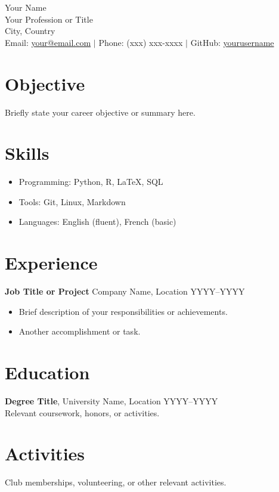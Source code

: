 \documentclass[a4paper,10pt]{article}
\begin{document}
\begin{center}
    {\LARGE Your Name} \\
    Your Profession or Title \\
    City, Country \\
    Email: \href{mailto:your@email.com}{your@email.com} $\vert$ Phone: (xxx) xxx-xxxx $\vert$ GitHub: \href{https://github.com/yourusername}{yourusername}
\end{center}

\section*{Objective}
Briefly state your career objective or summary here.

\section*{Skills}
\begin{itemize}[leftmargin=*]
    \item Programming: Python, R, LaTeX, SQL
    \item Tools: Git, Linux, Markdown
    \item Languages: English (fluent), French (basic)
\end{itemize}

\section*{Experience}
\textbf{Job Title or Project} \hfill Company Name, Location \hfill YYYY--YYYY\\
\begin{itemize}[leftmargin=*]
    \item Brief description of your responsibilities or achievements.
    \item Another accomplishment or task.
\end{itemize}

\section*{Education}
\textbf{Degree Title}, University Name, Location \hfill YYYY--YYYY\\
Relevant coursework, honors, or activities.

\section*{Activities}
Club memberships, volunteering, or other relevant activities.
\end{document}
